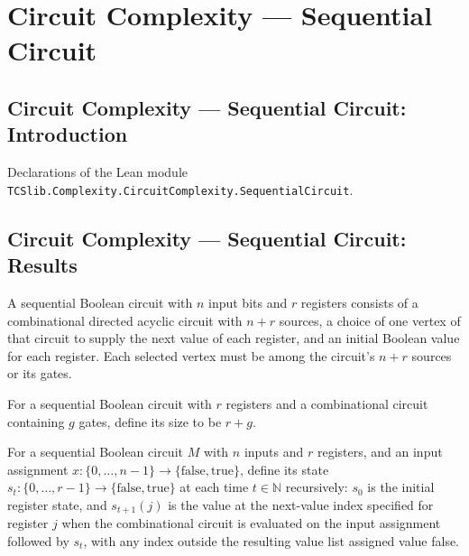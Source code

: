 \section{Circuit Complexity --- Sequential Circuit}
\subsection*{Circuit Complexity --- Sequential Circuit: Introduction}

Declarations of the Lean module \texttt{TCSlib.Complexity.CircuitComplexity.SequentialCircuit}.

\subsection*{Circuit Complexity --- Sequential Circuit: Results}

\begin{definition}
\label{BoolCircuit.SeqCircuit}
\leanok
{}
A sequential Boolean circuit with $n$ input bits and $r$ registers consists of a
combinational directed acyclic circuit with $n+r$ sources, a choice of one vertex of
that circuit to supply the next value of each register, and an initial Boolean value for
each register. Each selected vertex must be among the circuit's $n+r$ sources or its
gates.
\end{definition}

\begin{definition}
\label{BoolCircuit.SeqCircuit.size}
\leanok
For a sequential Boolean circuit with $r$ registers and a combinational circuit
containing $g$ gates, define its size to be $r+g$.
\end{definition}

\begin{definition}
\label{BoolCircuit.SeqCircuit.state}
\leanok
{}
For a sequential Boolean circuit $M$ with $n$ inputs and $r$ registers, and an input
assignment $x\colon\{0,\ldots,n-1\}\to\{\mathrm{false},\mathrm{true}\}$, define its
state $s_t\colon\{0,\ldots,r-1\}\to\{\mathrm{false},\mathrm{true}\}$ at each time
$t\in\mathbb{N}$ recursively: $s_0$ is the initial register state, and $s_{t+1}(j)$ is
the value at the next-value index specified for register $j$ when the combinational
circuit is evaluated on the input assignment followed by $s_t$, with any index outside
the resulting value list assigned value false.
\end{definition}

